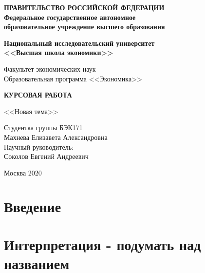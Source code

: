 \documentclass[a4paper, 12pt]{article}
\begin{document}
\thispagestyle{empty}
\begin{center}
	\textbf{ПРАВИТЕЛЬСТВО РОССИЙСКОЙ ФЕДЕРАЦИИ}\\
	\vspace{3ex}
	\textbf{Федеральное государственное автономное\\ образовательное учреждение высшего образования}
	
	\vspace{3ex}
	
	\textbf{Национальный исследовательский университет \\ <<Высшая школа экономики>>}
	
	\vspace{10ex}
	\begin{flushright}
		Факультет экономических наук\\
		Образовательная программа <<Экономика>>
	\end{flushright}
\end{center}
\vspace{12ex}

\begin{center}
	{\textbf{КУРСОВАЯ РАБОТА
	}}
	\vspace{1ex}
	
	<<Новая тема>>
\end{center}
\vspace{4ex}
\begin{flushright}
	\noindent
	Студентка группы БЭК171\\Махнева Елизавета Александровна\\
	\vspace{13ex}
	Научный руководитель:\\
	Соколов Евгений Андреевич
	
\end{flushright}	

\vfill

\begin{center}
	Москва 2020
	
\end{center}
\newpage
	\tableofcontents
	\newpage
	
	\section{Введение}
	
	\newpage
	
	\section{Интерпретация - подумать над названием}
\end{document}
